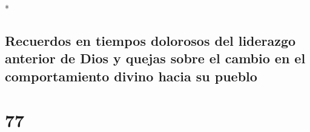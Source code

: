 \begin{paracol}{2}
\begin{otherlanguage}{english}
\end{otherlanguage}

\switchcolumn[0]*

\hypertarget{recuerdos-en-tiempos-dolorosos-del-liderazgo-anterior-de-dios-y-quejas-sobre-el-cambio-en-el-comportamiento-divino-hacia-su-pueblo}{%
\subsection{Recuerdos en tiempos dolorosos del liderazgo anterior de
Dios y quejas sobre el cambio en el comportamiento divino hacia su
pueblo}\label{recuerdos-en-tiempos-dolorosos-del-liderazgo-anterior-de-dios-y-quejas-sobre-el-cambio-en-el-comportamiento-divino-hacia-su-pueblo}}

\hypertarget{section-152}{%
\section{77}\label{section-152}}


\end{paracol}

